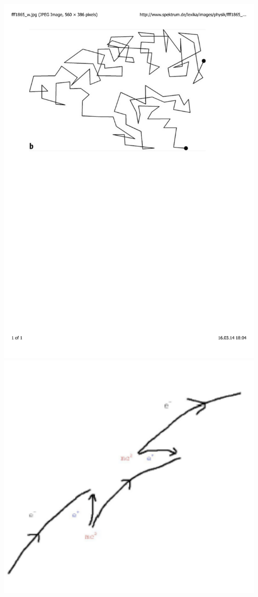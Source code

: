 \documentclass[mathserif,8pt]{beamer}
\begin{document}
\begin{frame}
\begin{columns}
\begin{column}{.50\textwidth}
	\includegraphics[viewport = 60 450 500 800, clip, scale=0.25]{figures/brownian_motion.pdf}\\
	\includegraphics[viewport = 0 0 300 300, clip, scale=0.3]{figures/zitterbewegung.pdf}
    \end{column}
    \end{columns}
\end{frame}
\end{document}
